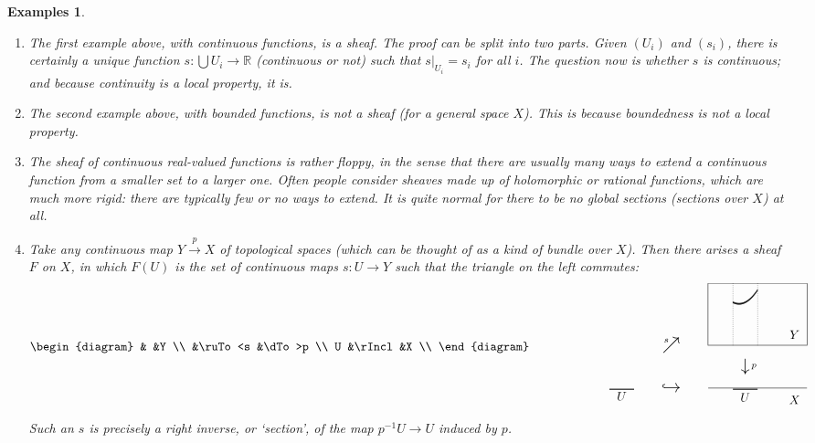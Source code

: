 \documentclass[12pt]{article}
\newcommand{\reals}{\mathbb{R}}
\newcommand{\cell}[4]{\put(#1,#2){\makebox(0,0)[#3]{\ensuremath{#4}}}}
\newcommand{\toby}[1]{\stackrel{#1}{\to}}
\newcommand{\restr}[1]{\vert_{#1}}
\newcommand{\incl}{\hookrightarrow}
\newcommand{\cln}{\colon}
\newtheorem{preexamples}[thm]{Examples}
\newenvironment{examples}{\begin{preexamples}\upshape}{\end{preexamples}}
\begin{document}
\begin{examples}        \label{eg:sheaves}
\begin{enumerate}
\item The first example above, with continuous functions, is a sheaf.  The
proof can be split into two parts.  Given $(U_i)$ and $(s_i)$, there is
certainly a unique \emph{function} $s\cln \bigcup U_i \to \reals$ (continuous
or not) such that $s\restr{U_i} = s_i$ for all $i$.  The question now is
whether $s$ is continuous; and because continuity is a local property, it is.

\item The second example above, with bounded functions, is not a sheaf (for a
general space $X$).  This is because boundedness is \emph{not} a local
property.  

\item  \label{eg:shf-extend}
The sheaf of continuous real-valued functions is rather floppy, in the
sense that there are usually many ways to extend a continuous function from a
smaller set to a larger one.  Often people consider sheaves made up of
holomorphic or rational functions, which are much more rigid: there are
typically few or no ways to extend.  It is quite normal for there to be no
global sections (sections over $X$) at all.

\item   \label{eg:shf-bundle} 
Take any continuous map $Y \toby{p} X$ of topological spaces (which can be
thought of as a kind of bundle over $X$).  Then there arises a sheaf $F$ on
$X$, in which $F(U)$ is the set of continuous maps $s\cln U \to Y$ such that
the triangle on the left commutes:
\[
\begin{diagram}
        &               &Y      \\
        &\ruTo<s        &\dTo>p \\
U       &\rIncl         &X      \\
\end{diagram}
\qquad\qquad\qquad
\setlength{\unitlength}{1em}
\setlength{\fboxsep}{0pt}
\begin{array}{c}
\begin{picture}(16,10)
\thicklines
\put(0,1.4){\line(1,0){2}}
\cell{1}{.5}{b}{U}
% 
\put(10,1.4){\line(1,0){2}}
\cell{11}{.4}{b}{U}
\thinlines
\put(8,1.5){\line(1,0){8}}
\cell{15}{0.2}{b}{X}
% 
\put(8,5){\framebox(8,5)}
\cell{15}{5.5}{b}{Y}
% 
\qbezier[30](10,5)(10,7.5)(10,10)
\qbezier[30](12,5)(12,7.5)(12,10)
\qbezier(10,8.5)(11,8)(12,9.5)
\qbezier(10,8.45)(11,7.95)(12,9.45)
% 
\cell{5}{1.5}{c}{\mbox{\Large\ensuremath{\incl}}}
\cell{11}{3.25}{c}{\mbox{\Large\ensuremath{\downarrow}}}
\cell{11.5}{3.25}{l}{\scriptstyle{p}}
\cell{5}{5}{c}{\mbox{\Large\ensuremath{\nearrow}}}
\cell{4.8}{5.2}{br}{\scriptstyle{s}}
\end{picture}%
\end{array}
\]
Such an $s$ is precisely a right inverse, or `section', of the map
$p^{-1}U \to U$ induced by $p$.
\end{enumerate}
\end{examples}
\end{document}

